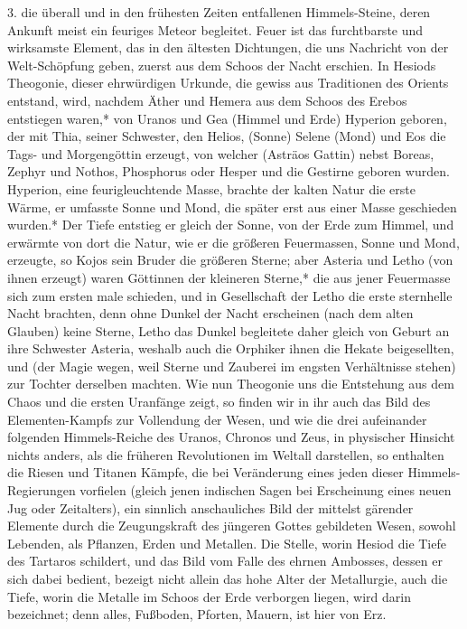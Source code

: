 \documentclass[a4paper, 11pt, oneside, polutonikogreek, german]{article}
\begin{document}
3. die überall und in den frühesten Zeiten entfallenen Himmels-Steine, deren Ankunft meist ein feuriges Meteor begleitet. Feuer ist das furchtbarste und wirksamste Element, das in den ältesten Dichtungen, die uns Nachricht von der Welt-Schöpfung geben, zuerst aus dem Schoos der Nacht erschien. In Hesiods Theogonie, dieser ehrwürdigen Urkunde, die gewiss aus Traditionen des Orients entstand, wird, nachdem Äther und Hemera aus dem Schoos des Erebos entstiegen waren,* von Uranos und Gea (Himmel und Erde) Hyperion geboren, der mit Thia, seiner Schwester, den Helios, (Sonne) Selene (Mond) und Eos die Tags- und Morgengöttin erzeugt, von welcher (Asträos Gattin) nebst Boreas, Zephyr und Nothos, Phosphorus oder Hesper und die Gestirne geboren wurden. Hyperion, eine feurigleuchtende Masse, brachte der kalten Natur die erste Wärme, er umfasste Sonne und Mond, die später erst aus einer Masse geschieden wurden.* Der Tiefe entstieg er gleich der Sonne, von der Erde zum Himmel, und erwärmte von dort die Natur, wie er die größeren Feuermassen, Sonne und Mond, erzeugte, so Kojos sein Bruder die größeren Sterne; aber Asteria und Letho (von ihnen erzeugt) waren Göttinnen der kleineren Sterne,* die aus jener Feuermasse sich zum ersten male schieden, und in Gesellschaft der Letho die erste sternhelle Nacht brachten, denn ohne Dunkel der Nacht erscheinen (nach dem alten Glauben) keine Sterne, Letho das Dunkel begleitete daher gleich von Geburt an ihre Schwester Asteria, weshalb auch die Orphiker ihnen die Hekate beigesellten, und (der Magie wegen, weil Sterne und Zauberei im engsten Verhältnisse stehen) zur Tochter derselben machten. Wie nun Theogonie uns die Entstehung aus dem Chaos und die ersten Uranfänge zeigt, so finden wir in ihr auch das Bild des Elementen-Kampfs zur Vollendung der Wesen, und wie die drei aufeinander folgenden Himmels-Reiche des Uranos, Chronos und Zeus, in physischer Hinsicht nichts anders, als die früheren Revolutionen im Weltall darstellen, so enthalten die Riesen und Titanen Kämpfe, die bei Veränderung eines jeden dieser Himmels-Regierungen vorfielen (gleich jenen indischen Sagen bei Erscheinung eines neuen Jug oder Zeitalters), ein sinnlich anschauliches Bild der mittelst gärender Elemente durch die Zeugungskraft des jüngeren Gottes gebildeten Wesen, sowohl Lebenden, als Pflanzen, Erden und Metallen. Die Stelle, worin Hesiod die Tiefe des Tartaros schildert, und das Bild vom Falle des ehrnen Ambosses, dessen er sich dabei bedient, bezeigt nicht allein das hohe Alter der Metallurgie, auch die Tiefe, worin die Metalle im Schoos der Erde verborgen liegen, wird darin bezeichnet; denn alles, Fußboden, Pforten, Mauern, ist hier von Erz.
\end{document}
